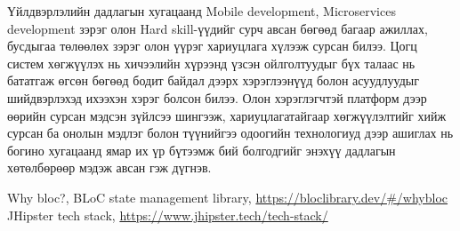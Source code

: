 \documentclass[12pt,A4]{report}
\begin{document}
\hspace{0.5cm}
Үйлдвэрлэлийн дадлагын хугацаанд Mobile development, Microservices development зэрэг олон Hard skill-үүдийг сурч авсан бөгөөд багаар ажиллах, бусдыгаа төлөөлөх зэрэг олон үүрэг хариуцлага хүлээж сурсан билээ. 
Цогц систем хөгжүүлэх нь хичээлийн хүрээнд үзсэн ойлголтуудыг бүх талаас нь бататгаж өгсөн бөгөөд бодит байдал дээрх хэрэглээнүүд болон асуудлуудыг шийдвэрлэхэд ихээхэн хэрэг болсон билээ. Олон хэрэглэгчтэй платформ дээр өөрийн сурсан мэдсэн зүйлсээ шингээж, хариуцлагатайгаар хөгжүүлэлтийг хийж сурсан ба онолын мэдлэг болон түүнийгээ одоогийн технологиуд дээр ашиглах нь богино хугацаанд ямар их үр бүтээмж бий болгодгийг энэхүү дадлагын хөтөлбөрөөр мэдэж авсан гэж дүгнэв.

\singlespace
{}
\begin{thebibliography}{НОМ ЗҮЙ}
	Why bloc?, BLoC state management library, \url{https://bloclibrary.dev/#/whybloc}
	JHipster tech stack, \url{https://www.jhipster.tech/tech-stack/}
\end{thebibliography}



\end{document}
